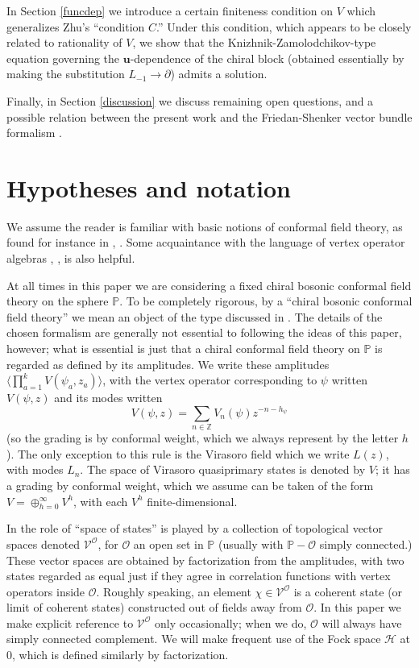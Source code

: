 \documentclass[a4paper,12pt]{article}
\newcommand{\Z}{{\mathbb Z}}
\newcommand{\uu}{{\mathbf u}}
\newcommand{\PP}{{\mathbb P}}
\newcommand{\F}{{\mathcal H}}
\newcommand{\OO}{{\mathcal O}}
\newcommand{\V}{{\mathcal V}}
\newcommand{\IP}[1]{\langle#1\rangle}
\begin{document}
In Section \ref{funcdep} we introduce a certain finiteness condition on $V$ which generalizes
Zhu's ``condition $C$.''  Under this condition, which appears to be closely related to rationality of $V$, we show that
the Knizhnik-Zamolodchikov-type equation governing the $\uu$-dependence of the chiral block (obtained
essentially by making the substitution $L_{-1} \to \partial$) admits
a solution.

Finally, in Section \ref{discussion} we discuss remaining open questions,
and a possible relation between
the present work and the Friedan-Shenker vector bundle formalism
\cite{FS}.


\section{Hypotheses and notation} \label{notation}

We assume the reader is familiar with basic notions of conformal field
theory, as found for instance in \cite{DFMS}, \cite{Greview}.  Some
acquaintance with the language of vertex operator algebras \cite{FLM},
\cite{Kac}, \cite{Borch} is also helpful.

At all times in this paper we are considering a fixed chiral bosonic conformal field theory
on the sphere $\PP$.  To be completely rigorous, by a ``chiral bosonic conformal field theory'' we mean
an object of the type discussed in \cite{GG}.  The details of the chosen formalism are generally not
essential to following the ideas of this paper, however; what is essential is just that a chiral conformal field
theory on $\PP$ is regarded as defined by its amplitudes.
We write these amplitudes $\IP{\prod_{a=1}^k V(\psi_a, z_a)}$, with the vertex operator corresponding
to $\psi$ written $V(\psi, z)$
and its modes written 
\begin{equation}
V(\psi, z) = \sum_{n \in \Z} V_n(\psi) z^{-n-h_\psi}
\end{equation}
(so the grading is by conformal weight, which we always represent by the letter $h$).
The only exception to this rule is the Virasoro field which we write $L(z)$, with modes $L_n$.
The space of Virasoro quasiprimary states is denoted by $V$; it has a grading by conformal weight, which we assume
can be taken of the form
$V = \oplus_{h=0}^\infty V^h$, with each $V^h$ finite-dimensional.

In \cite{GG} the role of ``space of states'' 
is played by a collection of topological vector spaces denoted $\V^\OO$,
for $\OO$ an open set in $\PP$ (usually with $\PP - \OO$ simply connected.)  These vector spaces are obtained by
factorization from the amplitudes, with two states regarded as equal 
just if they agree in correlation functions with vertex operators
inside $\OO$.
Roughly speaking, an element $\chi \in \V^\OO$ is a coherent state (or limit of coherent states)
constructed out of fields away from $\OO$.  In this paper we
make explicit 
reference to $\V^\OO$ only occasionally; when we do, $\OO$ will always have simply connected complement.
We will make frequent use of the Fock space $\F$ at $0$,
which is defined similarly by factorization.
\end{document}
